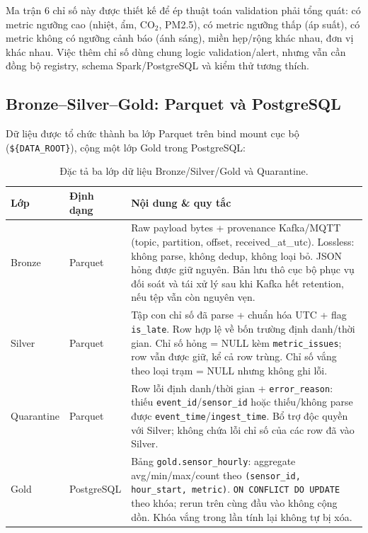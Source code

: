 Ma trận 6 chỉ số này được thiết kế để ép thuật toán validation phải tổng quát:
có metric ngưỡng cao (nhiệt, ẩm, CO$_2$, PM2.5), có metric ngưỡng thấp (áp suất),
có metric không có ngưỡng cảnh báo (ánh sáng), miền hẹp/rộng khác nhau, đơn vị
khác nhau. Việc thêm chỉ số dùng chung logic validation/alert, nhưng vẫn cần đồng
bộ registry, schema Spark/PostgreSQL và kiểm thử tương thích.

\subsection{Bronze--Silver--Gold: Parquet và PostgreSQL}

Dữ liệu được tổ chức thành ba lớp Parquet trên bind mount cục bộ
(\texttt{\$\{DATA\_ROOT\}}), cộng một lớp Gold trong PostgreSQL:

\begin{table}[H]
\centering
\caption{Đặc tả ba lớp dữ liệu Bronze/Silver/Gold và Quarantine.}
\label{tab:medallion}
\begin{tabularx}{\textwidth}{l l X}
\toprule
\textbf{Lớp} & \textbf{Định dạng} & \textbf{Nội dung \& quy tắc} \\
\midrule
Bronze & Parquet &
  Raw payload bytes + provenance Kafka/MQTT (topic, partition, offset,
  received\_at\_utc). Lossless: không parse, không dedup, không loại bỏ.
  JSON hỏng được giữ nguyên. Bản lưu thô cục bộ phục vụ đối soát và tái
  xử lý sau khi Kafka hết retention, nếu tệp vẫn còn nguyên vẹn. \\
Silver & Parquet &
  Tập con chỉ số đã parse + chuẩn hóa UTC + flag \texttt{is\_late}.
  Row hợp lệ về bốn trường định danh/thời gian. Chỉ số hỏng = NULL kèm
  \texttt{metric\_issues}; row vẫn được giữ, kể cả row trùng. Chỉ số vắng
  theo loại trạm = NULL nhưng không ghi lỗi. \\
Quarantine & Parquet &
  Row lỗi định danh/thời gian + \texttt{error\_reason}: thiếu
  \texttt{event\_id}/\texttt{sensor\_id} hoặc thiếu/không parse được
  \texttt{event\_time}/\texttt{ingest\_time}. Bổ trợ độc quyền với Silver;
  không chứa lỗi chỉ số của các row đã vào Silver. \\
Gold & PostgreSQL &
  Bảng \texttt{gold.sensor\_hourly}: aggregate avg/min/max/count theo
  \texttt{(sensor\_id, hour\_start, metric)}. \texttt{ON CONFLICT DO UPDATE} theo khóa; rerun trên cùng đầu vào
  không cộng dồn. Khóa vắng trong lần tính lại không tự bị xóa. \\
\bottomrule
\end{tabularx}
\end{table}

